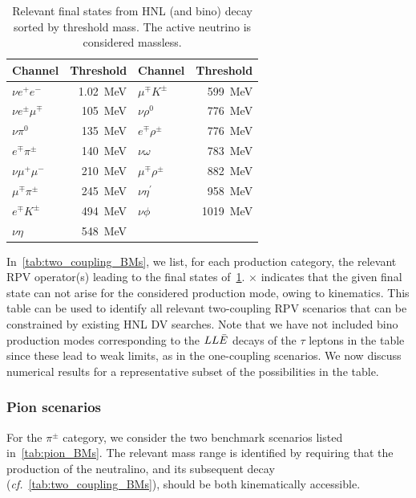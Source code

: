 \begin{table}[!ht]
   \centering
\begin{tabular}{|lr|lr|}
\hline
Channel & Threshold & Channel & Threshold  \\
\hline
$\nu e^+ e^-$ & \SI{1.02}{\MeV} &$\mu^{\mp} K^{ \pm}$ & \SI{599}{\MeV} \\
$\nu e^{ \pm} \mu^{\mp}$ & \SI{105}{\MeV} & $\nu \rho^0$ & \SI{776}{\MeV} \\
$\nu \pi^0$ & \SI{135}{\MeV} & $e^{\mp} \rho^{ \pm}$ & \SI{776}{\MeV} \\
$e^{\mp} \pi^{ \pm}$ & \SI{140}{\MeV} & $\nu \omega$ & \SI{783}{\MeV} \\
$\nu \mu^{+} \mu^{-}$ & \SI{210}{\MeV} & $\mu^{\mp} \rho^{ \pm}$ & \SI{882}{\MeV} \\
$\mu^{\mp} \pi^{ \pm}$ & \SI{245}{\MeV} & $\nu \eta^{\prime}$ & \SI{958}{\MeV} \\
$e^{\mp} K^{ \pm}$ &  \SI{494}{\MeV} & $\nu \phi$ & \SI{1019}{\MeV} \\
$\nu \eta$ & \SI{548}{\MeV} &&\\
\hline
\end{tabular}
 \caption{Relevant final states from HNL (and bino) decay sorted by threshold mass. The active neutrino is considered massless.}
 \label{tab:decay_modes_HNL}
 \end{table}
In~\cref{tab:two_coupling_BMs}, we list, for each production category, the relevant RPV operator(s) leading to the final states of~\cref{tab:decay_modes_HNL}.
$\bm{\times}$ indicates that the given final state can not arise for the considered production mode, owing to kinematics.
This table can be used to identify all relevant two-coupling RPV scenarios that can be constrained by existing HNL DV searches. Note that we have not included bino production modes corresponding to the $LL\Bar{E}$ decays of the $\tau$ leptons in the table since these lead to weak limits, as in the one-coupling scenarios. We now discuss numerical results for a representative subset of the possibilities in the table. 

\subsubsection{Pion scenarios} 
%
For the $\pi^\pm$ category, we consider the two benchmark scenarios listed in~\cref{tab:pion_BMs}. 
The relevant mass range is identified by requiring that the production of the neutralino, and its 
subsequent decay (\textit{cf.}~\cref{tab:two_coupling_BMs}), should be both kinematically accessible.

